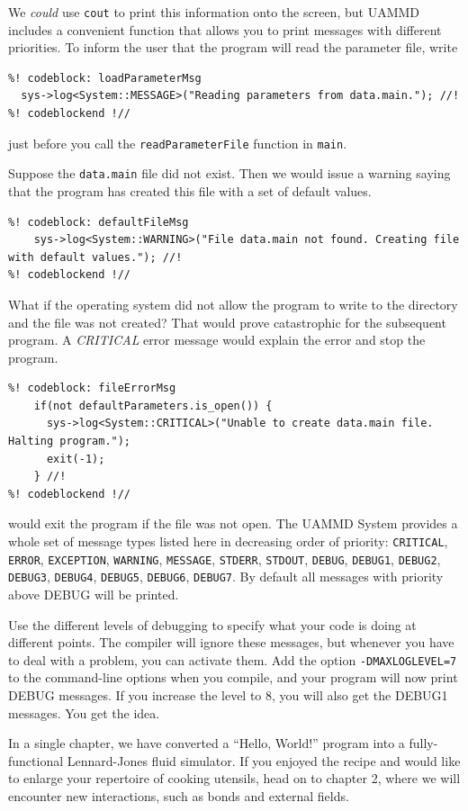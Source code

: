 We \textit{could} use \texttt{cout} to print this information onto the screen, 
but UAMMD includes a convenient function that allows you to print messages with 
different priorities. To inform the user that the program will read the 
parameter file, write
\begin{lstlisting}
%! codeblock: loadParameterMsg
  sys->log<System::MESSAGE>("Reading parameters from data.main."); //!
%! codeblockend !//
\end{lstlisting}
just before you call the \texttt{readParameterFile} function in \texttt{main}.

Suppose the \texttt{data.main} file did not exist. Then we would issue a warning
saying that the program has created this file with a set of default values.
\begin{lstlisting}
%! codeblock: defaultFileMsg
    sys->log<System::WARNING>("File data.main not found. Creating file with default values."); //!
%! codeblockend !//
\end{lstlisting}
What if the operating system did not allow the program to write to the directory
and the file was not created? That would prove catastrophic for the subsequent
program. A \textit{CRITICAL} error message would explain the error and stop the
program.
\begin{lstlisting}
%! codeblock: fileErrorMsg
    if(not defaultParameters.is_open()) {
      sys->log<System::CRITICAL>("Unable to create data.main file. Halting program.");
      exit(-1);
    } //!
%! codeblockend !//
\end{lstlisting}
would exit the program if the file was not open. The UAMMD System provides a
whole set of message types listed here in decreasing order of priority:
\texttt{CRITICAL}, \texttt{ERROR}, \texttt{EXCEPTION}, \texttt{WARNING},
\texttt{MESSAGE}, \texttt{STDERR}, \texttt{STDOUT}, \texttt{DEBUG},
\texttt{DEBUG1}, \texttt{DEBUG2}, \texttt{DEBUG3}, \texttt{DEBUG4},
\texttt{DEBUG5}, \texttt{DEBUG6}, \texttt{DEBUG7}. By default all messages
with priority above DEBUG will be printed.

Use the different levels of debugging to specify what your code is doing at 
different points. The compiler will ignore these messages, but whenever you have 
to deal with a problem, you can activate them. Add the option 
\texttt{-DMAXLOGLEVEL=7} to the command-line options when you compile, and your 
program will now print DEBUG messages. If you increase the level to 8, you will 
also get the DEBUG1 messages. You get the idea.

In a single chapter, we have converted a ``Hello, World!'' program into a 
fully-functional Lennard-Jones fluid simulator. If you enjoyed the recipe and
would like to enlarge your repertoire of cooking utensils, head on to chapter 2,
where we will encounter new interactions, such as bonds and external fields.

